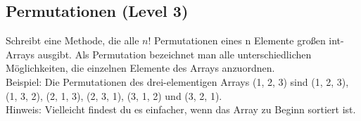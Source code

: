 \subsection{Permutationen (Level 3)}
Schreibt eine Methode, die alle $n!$ Permutationen eines n Elemente großen
int-Arrays ausgibt. Als Permutation bezeichnet man alle unterschiedlichen
Möglichkeiten, die einzelnen Elemente des Arrays anzuordnen.
\\Beispiel: Die Permutationen des drei-elementigen Arrays (1, 2, 3) sind (1, 2, 3),
(1, 3, 2), (2, 1, 3), (2, 3, 1), (3, 1, 2) und (3, 2, 1).
\\Hinweis: Vielleicht findest du es einfacher, wenn das Array zu Beginn sortiert ist.
